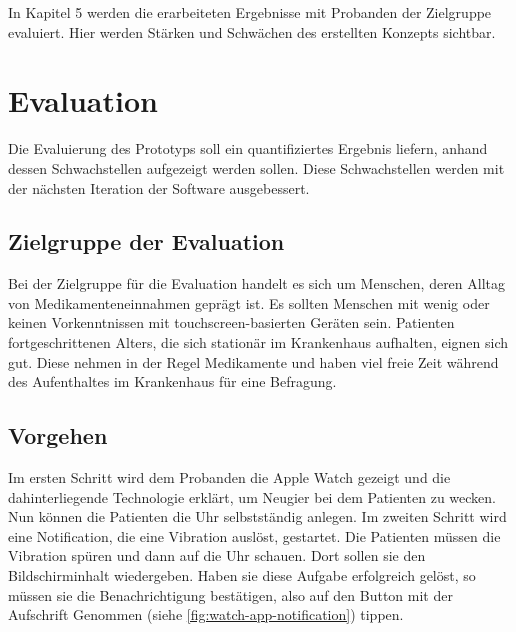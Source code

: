 In Kapitel 5 werden die erarbeiteten Ergebnisse mit Probanden der Zielgruppe evaluiert. Hier werden Stärken und Schwächen des erstellten Konzepts sichtbar.

\section{Evaluation}
Die Evaluierung des Prototyps soll ein quantifiziertes Ergebnis liefern, anhand dessen Schwachstellen aufgezeigt werden sollen. Diese Schwachstellen werden mit der nächsten Iteration der Software ausgebessert.

\subsection{Zielgruppe der Evaluation}
Bei der Zielgruppe für die Evaluation handelt es sich um Menschen, deren Alltag von Medikamenteneinnahmen geprägt ist. Es sollten Menschen mit wenig oder keinen Vorkenntnissen mit touchscreen-basierten Geräten sein. Patienten fortgeschrittenen Alters, die sich stationär im Krankenhaus aufhalten, eignen sich gut. Diese nehmen in der Regel Medikamente und haben viel freie Zeit während des Aufenthaltes im Krankenhaus für eine Befragung.

\subsection{Vorgehen}
\label{ch:vorgehen}
Im ersten Schritt wird dem Probanden die Apple Watch gezeigt und die dahinterliegende Technologie erklärt, um Neugier bei dem Patienten zu wecken. Nun können die Patienten die Uhr selbstständig anlegen. 
Im zweiten Schritt wird eine Notification, die eine Vibration auslöst, gestartet. Die Patienten müssen die Vibration spüren und dann auf die Uhr schauen. Dort sollen sie den Bildschirminhalt wiedergeben. Haben sie diese Aufgabe erfolgreich gelöst, so müssen sie die Benachrichtigung bestätigen, also auf den Button mit der Aufschrift \glqq Genommen \grqq (siehe \ref{fig:watch-app-notification}) tippen.

